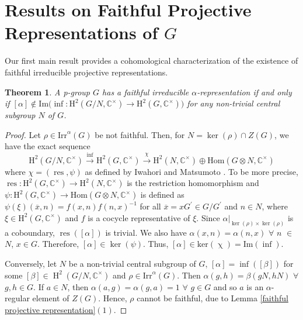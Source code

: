 \documentclass[a4paper,11pt]{amsart}
\numberwithin{equation}{section}
\numberwithin{equation}{subsection}
\newtheorem{theorem}{Theorem}[section]
\begin{document}
	\section{Results on Faithful Projective Representations of $G$} \label{faithful_projective}
	Our first main result provides a cohomological characterization of the existence of faithful irreducible projective representations.
	
	\begin{theorem} \label{cohomological characterization}
		A p-group $G$ has a faithful irreducible $\alpha$-representation if and only if $[\alpha] \notin \mathrm {Im}\big(\operatorname{inf} : \mathrm{H}^2\left(G / N, \mathbb{C}^{\times}\right) \rightarrow \mathrm{H}^2\left(G, \mathbb{C}^{\times}\right)\big)$ for any non-trivial central subgroup $N$ of $G$.    
	\end{theorem}
	
	\begin{proof}
		Let $\rho \in \mathrm{Irr}^\alpha(G)$ be not faithful. Then, for $N= \operatorname{ker}(\rho) \cap Z(G)$, we have the exact sequence
		$$
		\mathrm{H}^2(G / N, \mathbb{C}^{\times}) \xrightarrow{\text {inf}} \mathrm{H}^2(G, \mathbb{C}^{\times}) \xrightarrow{\chi} \mathrm{H}^2(N, \mathbb{C}^{\times}) \oplus \mathrm{Hom}(G \otimes N, \mathbb{C}^{\times})
		$$
		where $\chi=(\operatorname{res}, \psi)$ as defined by Iwahori and Matsumoto \cite{matsumoto}. To be more precise, $\operatorname{res}: \mathrm{H}^2(G, \mathbb{C}^{\times}) \rightarrow \mathrm{H}^2(N, \mathbb{C}^{\times})$ is the restriction homomorphism and $\psi: \mathrm{H}^2(G, \mathbb{C}^{\times}) \rightarrow \mathrm{Hom}(G \otimes N, \mathbb{C}^{\times})$ is defined as $\psi(\xi)(\overline{x}, n)=f(x, n)f(n, x)^{-1}$ for all $\overline{x}=x G^{\prime} \in G / G^{\prime}$ and $n \in N$, where $\xi\in \mathrm{H}^2(G, \mathbb{C}^{\times})$ and $f$ is a cocycle representative of $\xi$. 
		Since $\alpha|_{\operatorname{ker}(\rho) \times \operatorname{ker}(\rho)}$ is a coboundary,  $\operatorname{res}([\alpha])$ is trivial. We also have $\alpha(x, n)= \alpha(n, x)$ $\forall$ $n$ $\in$ $N$, $x\in G$. Therefore, $[\alpha] \in \operatorname{ker}(\psi)$. Thus, $[\alpha] \in \mathrm{ker}(\operatorname{\chi}) = \mathrm{Im} (\operatorname{inf})$. 
		
		Conversely, let $N$ be a non-trivial central subgroup of $G$, $[\alpha] = \operatorname{inf}([\beta])$ for some $[\beta] \in \operatorname{H}^2(G/N, \mathbb{C}^{\times})$ and $\rho\in \mathrm{ Irr}^\alpha(G)$. 
		Then $\alpha(g,h)= \beta(gN,hN)$ $\forall$ $g,h \in G$. If $a \in N$, then $\alpha(a,g) = \alpha(g,a)= 1$ $\forall$ $g \in G$ and so $a$ is an $\alpha$-regular element of $Z(G)$. Hence, $\rho$ cannot be faithful, due to Lemma \ref{faithful projective representation}$(1)$.
		
	\end{proof}
	
\end{document}
